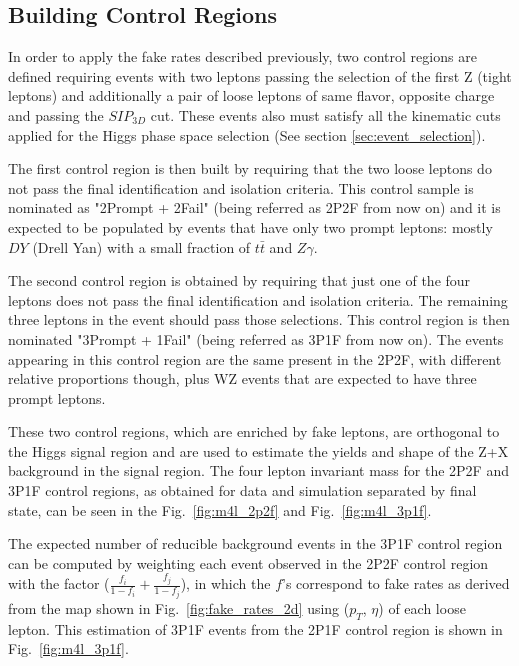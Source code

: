 \subsection{Building Control Regions}
\label{subsec:os_method}
In order to apply the fake rates described previously, two control regions are defined requiring events with two leptons passing the selection of the first Z (tight leptons) and additionally a pair of loose leptons of same flavor, opposite charge and passing the $SIP_{3D}$ cut. These events also must satisfy all the kinematic cuts applied for the Higgs phase space selection (See section \ref{sec:event_selection}). 

The first control region is then built by requiring that the two loose leptons do not pass the final identification and isolation criteria. This control sample is nominated as "2Prompt + 2Fail" (being referred as 2P2F from now on) and it is expected to be populated by events that have only two prompt leptons: mostly $DY$ (Drell Yan) with a small fraction of $t\bar{t}$ and $Z\gamma$. 

The second control region is obtained by requiring that just one of the four leptons does not pass the final identification and isolation criteria. The remaining three leptons in the event should pass those selections. This control region is then nominated "3Prompt + 1Fail" (being referred as 3P1F from now on). The events appearing in this control region are the same present in the 2P2F, with different relative proportions though, plus WZ events that are expected to have three prompt leptons.

These two control regions, which are enriched by fake leptons, are orthogonal to the Higgs signal region and are used to estimate the yields and shape of the Z+X background in the signal region. The four lepton invariant mass for the 2P2F and 3P1F control regions, as obtained for data and simulation separated by final state, can be seen in the Fig.~\ref{fig:m4l_2p2f} and Fig.~\ref{fig:m4l_3p1f}.

The expected number of reducible background events in the 3P1F control region can be computed by weighting each event observed in the 2P2F control region with the factor ($\frac{f_{i}}{1-f_{i}}+\frac{f_{j}}{1-f_{j}}$), in which the $f$'s correspond to fake rates as derived from the map shown in Fig.~\ref{fig:fake_rates_2d} using ($p_{T}$, $\eta$) of each loose lepton. This estimation of 3P1F events from the 2P1F control region is shown in Fig.~\ref{fig:m4l_3p1f}. 

